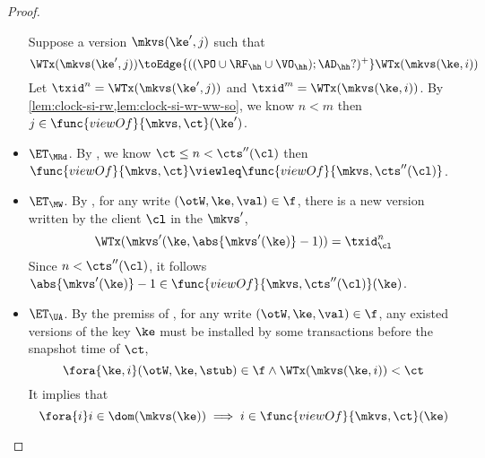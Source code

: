 \begin{proof}
\begin{itemize}
            Suppose a version \( \mkvs(\ke',j)\) such that 
            \[ 
                \WTx(\mkvs(\ke',j)) \toEdge{((\PO \cup \RF_{\hh} \cup \VO_{\hh}) ; \AD_{\hh}?)^+} \WTx(\mkvs(\ke,i))
            \]
            Let \( \txid^n = \WTx(\mkvs(\ke',j)) \) and \( \txid^m = \WTx(\mkvs(\ke,i)) \).
            By \cref{lem:clock-si-rw,lem:clock-si-wr-ww-so}, we know \( n < m \) then \( j  \in \func{viewOf}{\mkvs,\ct}(\ke')\).
        \item \( \ET_\MRd \).
            By , we know \( \ct \leq n < \cts''(\cl) \) then \( \func{viewOf}{\mkvs,\ct} \viewleq \func{viewOf}{\mkvs,\cts''(\cl)} \).
        \item \( \ET_\MW \).
            By , for any write \( (\otW, \ke, \val) \in \f \), there is a new version written by the client \( \cl \) in the \( \mkvs'  \),
            \[
                \WTx(\mkvs'(\ke,\abs{\mkvs'(\ke)} - 1)) = \txid_\cl^{n}
            \]
            Since \( n < \cts''(\cl)\), it follows \( \abs{\mkvs'(\ke)} - 1 \in \func{viewOf}{\mkvs,\cts''(\cl)}(\ke) \).
        \item \( \ET_\UA \).
            By the premiss of , for any write \( (\otW, \ke, \val) \in \f \), any existed versions of the key \( \ke \)
            must be installed by some transactions before the snapshot time of \( \ct \),
            \[
                \fora{\ke,i} (\otW, \ke, \stub) \in \f \land \WTx(\mkvs(\ke,i)) < \ct 
            \]
            It implies that 
            \[ 
                \fora{i} i \in \dom(\mkvs(\ke)) \implies i \in \func{viewOf}{\mkvs,\ct}(\ke) 
            \]
    \end{itemize}
\end{proof}

